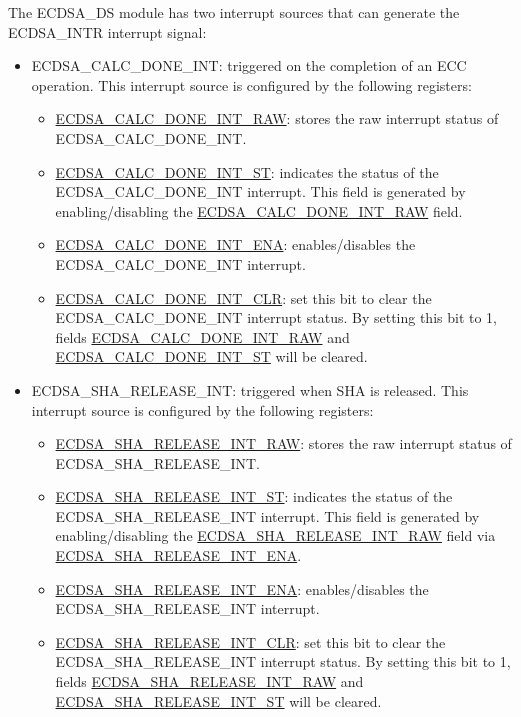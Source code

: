 \documentclass[main\_\_EN.tex]{subfiles}
\begin{document}
The ECDSA\_DS module has two interrupt sources that can generate the ECDSA\_INTR interrupt signal:
\begin{itemize}
	\item \label{int:ECDSACALCDONEINT}ECDSA\_CALC\_DONE\_INT: triggered on the completion of an ECC operation. This interrupt source is configured by the following registers:
	      \begin{itemize}
		      \item \hyperref[fielddesc:ECDSACALCDONEINTRAW]{ECDSA\_CALC\_DONE\_INT\_RAW}: stores the raw interrupt status of ECDSA\_CALC\_DONE\_INT.
		      \item \hyperref[fielddesc:ECDSACALCDONEINTST]{ECDSA\_CALC\_DONE\_INT\_ST}: indicates the status of the ECDSA\_CALC\_DONE\_INT interrupt. This field is generated by enabling/disabling the \hyperref[fielddesc:ECDSACALCDONEINTRAW]{ECDSA\_CALC\_DONE\_INT\_RAW} field.
		      \item \hyperref[fielddesc:ECDSACALCDONEINTENA]{ECDSA\_CALC\_DONE\_INT\_ENA}: enables/disables the ECDSA\_CALC\_DONE\_INT interrupt.
		      \item \hyperref[fielddesc:ECDSACALCDONEINTCLR]{ECDSA\_CALC\_DONE\_INT\_CLR}: set this bit to clear the ECDSA\_CALC\_DONE\_INT interrupt status. By setting this bit to 1, fields \hyperref[fielddesc:ECDSACALCDONEINTRAW]{ECDSA\_CALC\_DONE\_INT\_RAW} and  \hyperref[fielddesc:ECDSACALCDONEINTST]{ECDSA\_CALC\_DONE\_INT\_ST} will be cleared.
	      \end{itemize}
	\item \label{int:ECDSASHARELEASEINT}ECDSA\_SHA\_RELEASE\_INT: triggered when SHA is released. This interrupt source is configured by the following registers:
	      \begin{itemize}
		      \item \hyperref[fielddesc:ECDSASHARELEASEINTRAW]{ECDSA\_SHA\_RELEASE\_INT\_RAW}: stores the raw interrupt status of ECDSA\_SHA\_RELEASE\_INT.
		      \item \hyperref[fielddesc:ECDSASHARELEASEINTST]{ECDSA\_SHA\_RELEASE\_INT\_ST}: indicates the status of the ECDSA\_SHA\_RELEASE\_INT interrupt. This field is generated by enabling/disabling the \hyperref[fielddesc:ECDSASHARELEASEINTRAW]{ECDSA\_SHA\_RELEASE\_INT\_RAW} field via \hyperref[fielddesc:ECDSASHARELEASEINTENA]{ECDSA\_SHA\_RELEASE\_INT\_ENA}.
		      \item \hyperref[fielddesc:ECDSASHARELEASEINTENA]{ECDSA\_SHA\_RELEASE\_INT\_ENA}: enables/disables the ECDSA\_SHA\_RELEASE\_INT interrupt.
		      \item \hyperref[fielddesc:ECDSASHARELEASEINTCLR]{ECDSA\_SHA\_RELEASE\_INT\_CLR}: set this bit to clear the ECDSA\_SHA\_RELEASE\_INT interrupt status. By setting this bit to 1, fields \hyperref[fielddesc:ECDSASHARELEASEINTRAW]{ECDSA\_SHA\_RELEASE\_INT\_RAW} and  \hyperref[fielddesc:ECDSASHARELEASEINTST]{ECDSA\_SHA\_RELEASE\_INT\_ST} will be cleared.
	      \end{itemize}
\end{itemize}
\end{document}
